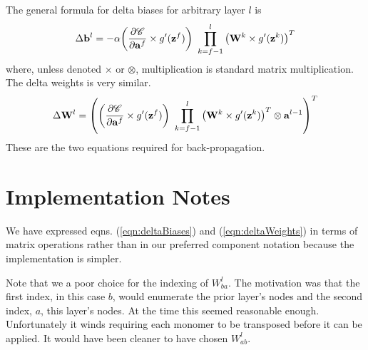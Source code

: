 \documentclass[twocolumn]{revtex4-1}
\newcommand{\bld}[1]{\vectorbold{#1}}
\newcommand{\cC}{\mathscr{C}}
\newcommand{\parpar}[2]{\frac{\partial #1}{\partial #2}}
\begin{document}
The general formula for delta biases for arbitrary layer $l$ is
\begin{align}
    \label{eqn:deltaBiases}
    \Delta \bld{b}^l = -\alpha {\left( \parpar{\cC}{\bld{a}^f} \times g'(\bld{z}^f) \right) \
        \prod_{k = f-1}^l {\left( \bld{W}^k \times g'(\bld{z}^k) \right)}^T}
\end{align}
where, unless denoted $\times$ or $\otimes$, multiplication is standard matrix multiplication. The delta weights is very similar.
\begin{align}
    \label{eqn:deltaWeights}
    \Delta \bld{W}^l = {\left( \left( \parpar{\cC}{\bld{a}^f} \times g'(\bld{z}^f) \right) \
        \prod_{k = f-1}^l {\left( \bld{W}^k \times g'(\bld{z}^k) \right)}^T \otimes \bld{a}^{l-1} \right)}^T
\end{align}
These are the two equations required for back-propagation. 

\section{Implementation Notes}
We have expressed eqns. (\ref{eqn:deltaBiases}) and (\ref{eqn:deltaWeights}) in terms of matrix operations rather than in our preferred component notation because the implementation is simpler.

Note that we a poor choice for the indexing of $W^l_{b a}$. The motivation was that the first index, in this case $b$, would enumerate the prior layer's nodes and the second index, $a$, this layer's nodes. At the time this seemed reasonable enough. Unfortunately it winds requiring each monomer to be transposed before it can be applied. It would have been cleaner to have chosen $W^l_{a b}$.
\end{document}
